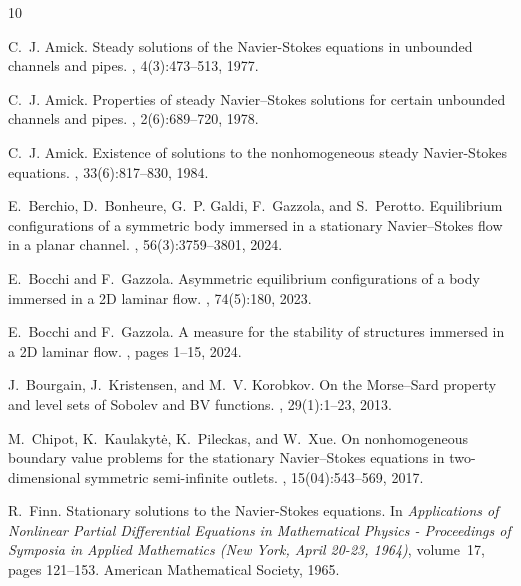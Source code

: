\documentclass[11pt]{article}
\numberwithin{equation}{section}
\numberwithin{figure}{section}
\begin{document}
{}

\begin{thebibliography}{10}


C.~J. Amick.
\newblock Steady solutions of the {N}avier-{S}tokes equations in unbounded
  channels and pipes.
, 4(3):473--513, 1977.

C.~J. Amick.
\newblock Properties of steady {N}avier--{S}tokes solutions for certain
  unbounded channels and pipes.
,
  2(6):689--720, 1978.
  
C.~J. Amick.
\newblock Existence of solutions to the nonhomogeneous steady {N}avier-{S}tokes
  equations.
, 33(6):817--830, 1984.


E.~Berchio, D.~Bonheure, G.~P. Galdi, F.~Gazzola, and S.~Perotto.
\newblock Equilibrium configurations of a symmetric body immersed in a
  stationary {N}avier--{S}tokes flow in a planar channel.
, 56(3):3759--3801, 2024.

E.~Bocchi and F.~Gazzola.
\newblock Asymmetric equilibrium configurations of a body immersed in a 2{D}
  laminar flow.
,
  74(5):180, 2023.

E.~Bocchi and F.~Gazzola.
\newblock A measure for the stability of structures immersed in a 2{D} laminar
  flow.
, pages 1--15, 2024.

J.~Bourgain, J.~Kristensen, and M.~V. Korobkov.
\newblock On the {M}orse--{S}ard property and level sets of {S}obolev and {BV}
  functions.
, 29(1):1--23, 2013.

M.~Chipot, K.~Kaulakyt{\.e}, K.~Pileckas, and W.~Xue.
\newblock On nonhomogeneous boundary value problems for the stationary
  {N}avier--{S}tokes equations in two-dimensional symmetric semi-infinite
  outlets.
, 15(04):543--569, 2017.

R.~Finn.
\newblock Stationary solutions to the {N}avier-{S}tokes equations.
\newblock In {\it Applications of Nonlinear Partial Differential Equations in
  Mathematical Physics - Proceedings of Symposia in Applied Mathematics (New
  York, April 20-23, 1964)}, volume~17, pages 121--153. American Mathematical
  Society, 1965.


\end{thebibliography}
\end{document}
